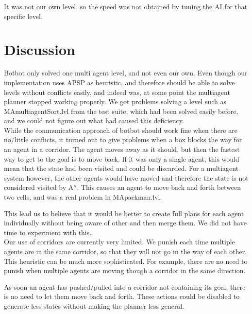 \documentclass[letterpaper]{article}
\begin{document}
It was not our own level, so the speed was not obtained by tuning the AI for that
specific level.


\section{Discussion}
Botbot only solved one multi agent level, and not even our own. Even though our
implementation uses APSP as heuristic, and therefore should be able to solve
levels without conflicts easily, and indeed was, at some point the multiagent
planner stopped working properly. We got problems solving a level such as MAmultiagentSort.lvl
from the test suite, which had been solved easily before, and we could not
figure out what had caused this deficiency.\\

While the communication approach of botbot should work fine when there are
no/little conflicts, it turned out to give problems when a box blocks the way for
an agent in a corridor. The agent moves away as it should, but then the fastest
way to get to the goal is to move back. If it was only a single agent, this would
mean that the state had been visited and could be discarded. For a multiagent system
however, the other agents would have moved and therefore the state is not considered
visited by A*. This causes an agent to move back and forth between two cells, and
was a real problem in MApackman.lvl.

This lead us to believe that it would be better to create full plans for each agent
individually without being aware of other and then merge them. We did not have time
to experiment with this.\\


Our use of corridors are currently very limited. We punish each time multiple agents
are in the same corridor, so that they will not go in the way of each other. This
heuristic can be much more sophisticated. For example, there are no need to punish
when multiple agents are moving though a corridor in the same direction.

As soon an agent has pushed/pulled into a corridor not containing its goal, there
is no need to let them move back and forth. These actions could be disabled to
generate less states without making the planner less general.\\
\end{document}
